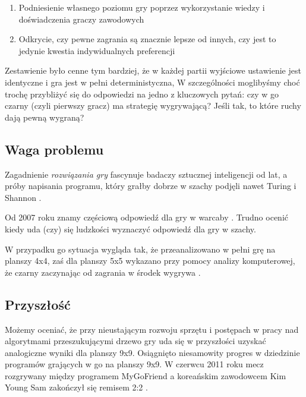 \documentclass[11pt,leqno]{article}
\begin{document}
\begin{enumerate}
\item Podniesienie własnego poziomu gry poprzez wykorzystanie wiedzy i doświadczenia graczy zawodowych
\item Odkrycie, czy pewne zagrania są znacznie lepsze od innych, czy jest to jedynie kwestia indywidualnych preferencji
\end{enumerate}

Zestawienie było cenne tym bardziej, że w każdej partii wyjściowe ustawienie jest identyczne i gra jest w pełni deterministyczna,
W szczególności moglibyśmy choć trochę przybliżyć się do odpowiedzi na jedno z kluczowych pytań: czy w go czarny
 (czyli pierwszy gracz) ma strategię wygrywającą? Jeśli tak, to które ruchy dają pewną wygraną?

\subsection{Waga problemu}

Zagadnienie \emph{rozwiązania gry} fascynuje badaczy sztucznej inteligencji od lat,
 a próby napisania programu, który grałby dobrze w szachy podjęli nawet Turing i Shannon \cite{ai}.

Od 2007 roku znamy częściową  odpowiedź dla gry w warcaby \cite{checkers}. Trudno ocenić kiedy uda (czy) się ludzkości wyznaczyć odpowiedź dla gry w szachy. 

W przypadku go sytuacja wygląda tak, że przeanalizowano w pełni grę na planszy 4x4, 
zaś dla planszy 5x5 wykazano przy pomocy analizy komputerowej, że czarny zaczynając od zagrania w środek wygrywa \cite{gofive}. 

\subsection{Przyszłość}

Możemy oceniać, że przy nieustającym rozwoju sprzętu i postępach w pracy nad  algorytmami przeszukującymi drzewo
gry uda się w przyszłości uzyskać analogiczne wyniki dla planszy 9x9. Osiągnięto niesamowity progres w dziedzinie 
programów grających w go na planszy 9x9. W czerwcu 2011 roku mecz rozgrywany
między programem MyGoFriend a koreańskim zawodowcem Kim Young Sam zakończył się remisem 2:2 \cite{promatch}.
\end{document}
